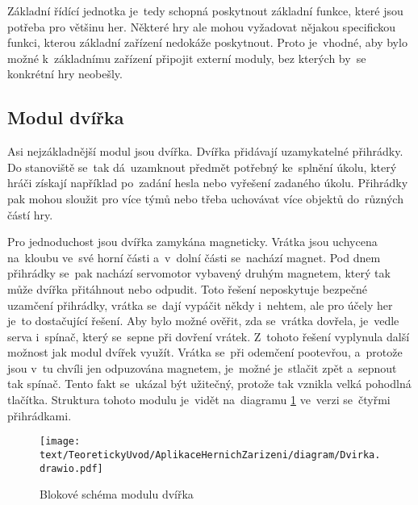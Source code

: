 Základní řídící jednotka je~tedy schopná poskytnout základní funkce, které jsou potřeba pro většinu her.
Některé hry ale mohou vyžadovat nějakou specifickou funkci, kterou základní zařízení nedokáže poskytnout.
Proto je~vhodné, aby bylo možné k~základnímu zařízení připojit externí moduly, bez kterých by~se konkrétní hry neobešly.

\subsection{Modul dvířka}
Asi nejzákladnější modul jsou dvířka.
Dvířka přidávají uzamykatelné přihrádky.
Do stanoviště se~tak dá~uzamknout předmět potřebný ke~splnění úkolu, který hráči získají například po~zadání hesla nebo vyřešení zadaného úkolu.
Přihrádky pak mohou sloužit pro více týmů nebo třeba uchovávat více objektů do~různých částí hry.

Pro jednoduchost jsou dvířka zamykána magneticky.
Vrátka jsou uchycena \\ na~kloubu ve~své horní části a~v~dolní části se~nachází magnet.
Pod dnem přihrádky se~pak nachází servomotor vybavený druhým magnetem, který tak může dvířka přitáhnout nebo odpudit.
Toto řešení neposkytuje bezpečné uzamčení přihrádky, vrátka se~dají vypáčit někdy i~nehtem, ale pro účely her je~to dostačující řešení.
Aby bylo možné ověřit, zda se~vrátka dovřela, je~vedle serva i~spínač, který se~sepne při dovření vrátek.
Z~tohoto řešení vyplynula další možnost jak modul dvířek využít.
Vrátka se~při odemčení pootevřou, a~protože jsou v~tu chvíli jen odpuzována magnetem, je~možné je~stlačit zpět a~sepnout tak spínač.
Tento fakt se~ukázal být užitečný, protože tak vznikla velká pohodlná tlačítka.
Struktura tohoto modulu je~vidět na~diagramu \ref{fig:diagram_dvirka} ve~verzi se~čtyřmi přihrádkami.

\begin{figure}[h]
    \centering
    \texttt{[image: text/TeoretickyUvod/AplikaceHernichZarizeni/diagram/Dvirka.drawio.pdf]}
    \caption{Blokové schéma modulu dvířka}
    \label{fig:diagram_dvirka}
\end{figure}
 
